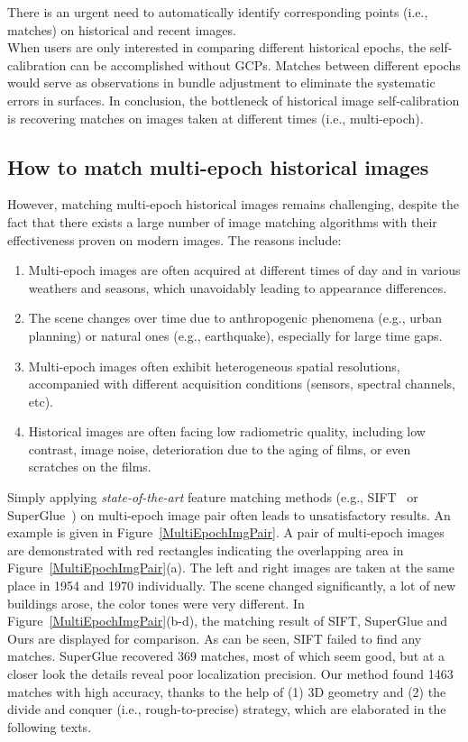 There is an urgent need to automatically identify corresponding points (i.e., matches) on historical and recent images.\\
When users are only interested in comparing different historical epochs, the self-calibration can be accomplished without \ac{GCP}s. Matches between different epochs would serve as observations in bundle adjustment to eliminate the systematic errors in surfaces. In conclusion, the bottleneck of historical image self-calibration is recovering matches on images taken at different times (i.e., multi-epoch).

\subsection{How to match multi-epoch historical images}
However, matching multi-epoch historical images remains challenging, despite the fact that there exists a large number of image matching algorithms with their effectiveness proven on modern images. The reasons include:
\begin{enumerate}
	\item Multi-epoch images are often acquired at different times of day and in various weathers and seasons, which unavoidably leading to appearance differences.
	\item The scene changes over time due to anthropogenic phenomena (e.g., urban planning) or natural ones (e.g., earthquake), especially for large time gaps.
	\item Multi-epoch images often exhibit heterogeneous spatial resolutions, accompanied with different acquisition conditions (sensors, spectral channels, etc).
	\item Historical images are often facing low radiometric quality, including low contrast, image noise, deterioration due to the aging of films, or even scratches on the films.
\end{enumerate}
Simply applying \textit{state-of-the-art} feature matching methods (e.g., SIFT~\cite{lowe2004distinctive} or SuperGlue~\cite{sarlin2020superglue}) on multi-epoch image pair often leads to unsatisfactory results. An example is given in Figure~\ref{MultiEpochImgPair}. A pair of multi-epoch images are demonstrated with red rectangles indicating the overlapping area in Figure~\ref{MultiEpochImgPair}(a). The left and right images are taken at the same place in 1954 and 1970 individually. The scene changed significantly, a lot of new buildings arose, the color tones were very different. In Figure~\ref{MultiEpochImgPair}(b-d), the matching result of SIFT, SuperGlue and Ours are displayed for comparison. As can be seen, SIFT failed to find any matches. SuperGlue recovered 369 matches, most of which seem good, but at a closer look the details reveal poor localization precision. Our method found 1463 matches with high accuracy, thanks to the help of (1) 3D geometry and (2) the divide and conquer (i.e., rough-to-precise) strategy, which are elaborated in the following texts.
